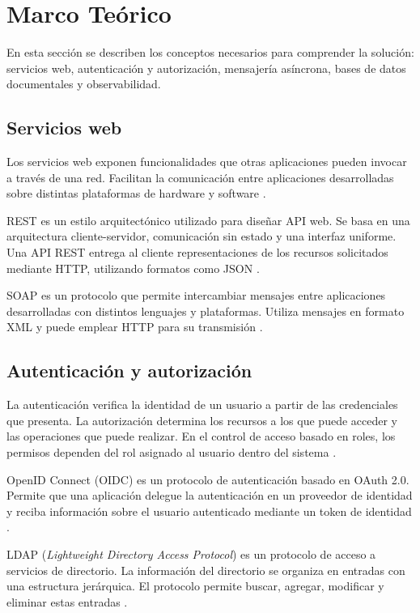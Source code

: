\section{Marco Teórico}
En esta sección se describen los conceptos necesarios para comprender la solución: servicios web, autenticación y autorización, mensajería asíncrona, bases de datos documentales y observabilidad.

\subsection{Servicios web}
Los servicios web exponen funcionalidades que otras aplicaciones pueden invocar a través de una red. Facilitan la comunicación entre aplicaciones desarrolladas sobre distintas plataformas de hardware y software \cite{OracleWebServices}.

REST es un estilo arquitectónico utilizado para diseñar API web. Se basa en una arquitectura cliente-servidor, comunicación sin estado y una interfaz uniforme. Una API REST entrega al cliente representaciones de los recursos solicitados mediante HTTP, utilizando formatos como JSON \cite{RedHatREST}.

SOAP es un protocolo que permite intercambiar mensajes entre aplicaciones desarrolladas con distintos lenguajes y plataformas. Utiliza mensajes en formato XML y puede emplear HTTP para su transmisión \cite{RedHatSOAPREST}.

\subsection{Autenticación y autorización}
La autenticación verifica la identidad de un usuario a partir de las credenciales que presenta. La autorización determina los recursos a los que puede acceder y las operaciones que puede realizar. En el control de acceso basado en roles, los permisos dependen del rol asignado al usuario dentro del sistema \cite{IBMAuth}.

OpenID Connect (OIDC) es un protocolo de autenticación basado en OAuth 2.0. Permite que una aplicación delegue la autenticación en un proveedor de identidad y reciba información sobre el usuario autenticado mediante un token de identidad \cite{MDNFederatedIdentity}.

LDAP (\textit{Lightweight Directory Access Protocol}) es un protocolo de acceso a servicios de directorio. La información del directorio se organiza en entradas con una estructura jerárquica. El protocolo permite buscar, agregar, modificar y eliminar estas entradas \cite{IBMLDAP}.

